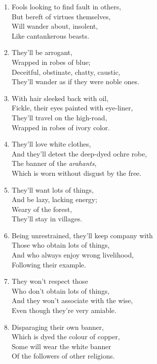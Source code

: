 \documentclass[10pt, openany]{book}
\begin{document}
\begin{enumerate}
\item Fools looking to find fault in others,\\
But bereft of virtues themselves,\\
Will wander about, insolent,\\
Like cantankerous beasts.

\item They’ll be arrogant,\\
Wrapped in robes of blue;\\
Deceitful, obstinate, chatty, caustic,\\
They’ll wander as if they were noble ones.

\item With hair sleeked back with oil,\\
Fickle, their eyes painted with eye-liner,\\
They’ll travel on the high-road,\\
Wrapped in robes of ivory color.

\item They’ll love white clothes,\\
And they’ll detest the deep-dyed ochre robe,\\
The banner of the \emph{arahants},\\
Which is worn without disgust by the free.

\item They’ll want lots of things,\\
And be lazy, lacking energy;\\
Weary of the forest,\\
They’ll stay in villages.

\item Being unrestrained, they’ll keep company with\\
Those who obtain lots of things,\\
And who always enjoy wrong livelihood,\\
Following their example.

\item They won’t respect those\\
Who don’t obtain lots of things,\\
And they won’t associate with the wise,\\
Even though they’re very amiable.

\item Disparaging their own banner,\\
Which is dyed the colour of copper,\\
Some will wear the white banner\\
Of the followers of other religions.


\end{enumerate}
\end{document}
